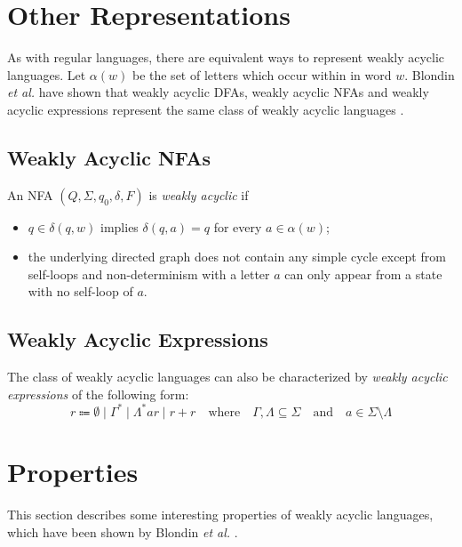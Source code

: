 \section{Other Representations}

As with regular languages, there are equivalent ways to represent weakly acyclic languages. Let $\alpha(w)$ be the set of letters which occur within in word $w$. 
Blondin \textit{et al.} have shown that weakly acyclic DFAs, weakly acyclic NFAs and weakly acyclic expressions represent the same class of weakly acyclic languages \cite{blondin_24}. 



\subsection{Weakly Acyclic NFAs}
An NFA $(Q, \Sigma, q_{0},\delta,F)$ is \textit{weakly acyclic} if 
\begin{itemize}[--,noitemsep]
	\item $q \in \delta(q,w)$ implies $\delta(q,a) = {q}$ for every $a \in \alpha(w)$;
	\item the underlying directed graph does not contain any simple cycle except from self-loops and non-determinism with a letter $a$ can only appear from a state with no self-loop of $a$.
\end{itemize}

\subsection{Weakly Acyclic Expressions}\label{sec:weakly_acyclic_regex}
The class of weakly acyclic languages can also be characterized by \textit{weakly acyclic expressions} of the following form:
\begin{equation*}
r \Coloneqq \emptyset \mid \Gamma^{*} \mid \Lambda^{*} a r \mid r + r \quad \text{where} \quad  \Gamma, \Lambda \subseteq \Sigma \quad \textrm{and} \quad a \in \Sigma \setminus \Lambda
\end{equation*}


\section{Properties}
This section describes some interesting properties of weakly acyclic languages, which have been shown by Blondin \textit{et al.} \cite{blondin_24}. 
